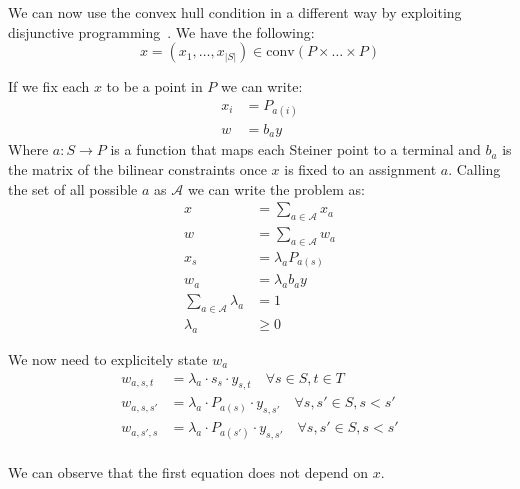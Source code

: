 \documentclass[11pt,reqno,a4paper]{amsart}
\numberwithin{equation}{section}
\theoremstyle{mytheorem}
\theoremstyle{myremark}
\theoremstyle{myparagraph}
\begin{document}
    We can now use the convex hull condition in a different way by exploiting disjunctive programming~\cite[2.11]{Conforti2014}.
    We have the following:
    \begin{equation}
        x = (x_1, \ldots, x_{|S|}) \in \text{conv}(P \times \ldots \times P)
    \end{equation}

    If we fix each $x$ to be a point in $P$ we can write:
    \begin{align}
        x_i &= P_{a(i)} \\
        w &= b_a y
    \end{align}
    Where $a: S \rightarrow P$ is a function that maps each Steiner point to a terminal and $b_a$ is the matrix of the bilinear
    constraints once $x$ is fixed to an assignment $a$.
    Calling the set of all possible $a$ as $\mathcal{A}$ we can write the problem as:
    \begin{align}
        x &= \sum_{a \in \mathcal{A}} x_a \\
        w &= \sum_{a \in \mathcal{A}} w_a \\
        x_s &= \lambda_a P_{a(s)} \\
        w_a &= \lambda_a b_a y \\
        \sum_{a \in \mathcal{A}} \lambda_a &= 1 \\
        \lambda_a &\geq 0
    \end{align}

    We now need to explicitely state $w_a$
    \begin{align}
        w_{a, s,t} &= \lambda_a \cdot s_s \cdot y_{s,t} \quad \forall s \in S, t \in T \\
        w_{a, s,s'} &= \lambda_a \cdot P_{a(s)} \cdot y_{s,s'} \quad \forall s, s' \in S, s < s' \\
        w_{a, s',s} &= \lambda_a \cdot P_{a(s')} \cdot y_{s,s'} \quad \forall s, s' \in S, s < s' \\
    \end{align}

    We can observe that the first equation does not depend on $x$.
\end{document}

